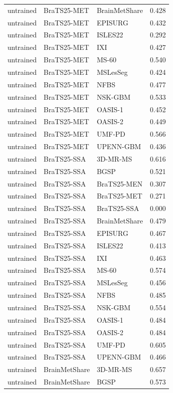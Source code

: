 \begin{tabular}{lllr}
untrained & BraTS25-MET & BrainMetShare & 0.428 \\
untrained & BraTS25-MET & EPISURG & 0.432 \\
untrained & BraTS25-MET & ISLES22 & 0.292 \\
untrained & BraTS25-MET & IXI & 0.427 \\
untrained & BraTS25-MET & MS-60 & 0.540 \\
untrained & BraTS25-MET & MSLesSeg & 0.424 \\
untrained & BraTS25-MET & NFBS & 0.477 \\
untrained & BraTS25-MET & NSK-GBM & 0.533 \\
untrained & BraTS25-MET & OASIS-1 & 0.452 \\
untrained & BraTS25-MET & OASIS-2 & 0.449 \\
untrained & BraTS25-MET & UMF-PD & 0.566 \\
untrained & BraTS25-MET & UPENN-GBM & 0.436 \\
untrained & BraTS25-SSA & 3D-MR-MS & 0.616 \\
untrained & BraTS25-SSA & BGSP & 0.521 \\
untrained & BraTS25-SSA & BraTS25-MEN & 0.307 \\
untrained & BraTS25-SSA & BraTS25-MET & 0.271 \\
untrained & BraTS25-SSA & BraTS25-SSA & 0.000 \\
untrained & BraTS25-SSA & BrainMetShare & 0.479 \\
untrained & BraTS25-SSA & EPISURG & 0.467 \\
untrained & BraTS25-SSA & ISLES22 & 0.413 \\
untrained & BraTS25-SSA & IXI & 0.463 \\
untrained & BraTS25-SSA & MS-60 & 0.574 \\
untrained & BraTS25-SSA & MSLesSeg & 0.456 \\
untrained & BraTS25-SSA & NFBS & 0.485 \\
untrained & BraTS25-SSA & NSK-GBM & 0.554 \\
untrained & BraTS25-SSA & OASIS-1 & 0.484 \\
untrained & BraTS25-SSA & OASIS-2 & 0.484 \\
untrained & BraTS25-SSA & UMF-PD & 0.605 \\
untrained & BraTS25-SSA & UPENN-GBM & 0.466 \\
untrained & BrainMetShare & 3D-MR-MS & 0.657 \\
untrained & BrainMetShare & BGSP & 0.573 \\

\end{tabular}
